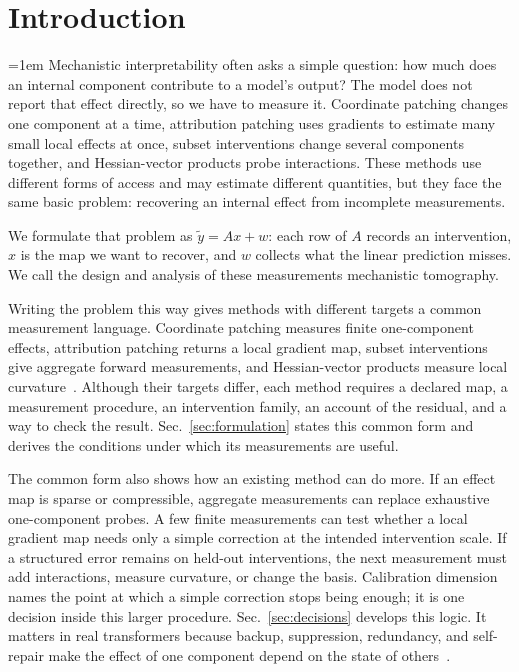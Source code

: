 \documentclass[sigconf,10pt,nonacm,balance=false]{acmart}
\begin{document}
\maketitle
\raggedbottom

\section{Introduction}

\begingroup
\emergencystretch=1em
Mechanistic interpretability often asks a simple question: how much does an internal component contribute to a model's output? The model does not report that effect directly, so we have to measure it. Coordinate patching changes one component at a time, attribution patching uses gradients to estimate many small local effects at once, subset interventions change several components together, and Hessian-vector products probe interactions. These methods use different forms of access and may estimate different quantities, but they face the same basic problem: recovering an internal effect from incomplete measurements.
\par
\endgroup

We formulate that problem as $\widetilde y=Ax+w$: each row of $A$ records an intervention, $x$ is the map we want to recover, and $w$ collects what the linear prediction misses. We call the design and analysis of these measurements mechanistic tomography.

Writing the problem this way gives methods with different targets a common measurement language. Coordinate patching measures finite one-component effects, attribution patching returns a local gradient map, subset interventions give aggregate forward measurements, and Hessian-vector products measure local curvature~\cite{zhang2024patching,syed2024attrib,bair2026compressed,zhang2026lies}. Although their targets differ, each method requires a declared map, a measurement procedure, an intervention family, an account of the residual, and a way to check the result. Sec.~\ref{sec:formulation} states this common form and derives the conditions under which its measurements are useful.

The common form also shows how an existing method can do more. If an effect map is sparse or compressible, aggregate measurements can replace exhaustive one-component probes. A few finite measurements can test whether a local gradient map needs only a simple correction at the intended intervention scale. If a structured error remains on held-out interventions, the next measurement must add interactions, measure curvature, or change the basis. Calibration dimension names the point at which a simple correction stops being enough; it is one decision inside this larger procedure. Sec.~\ref{sec:decisions} develops this logic. It matters in real transformers because backup, suppression, redundancy, and self-repair make the effect of one component depend on the state of others~\cite{wang2022ioi,mcgrath2023hydra,mcdougall2023copy}.
\end{document}
